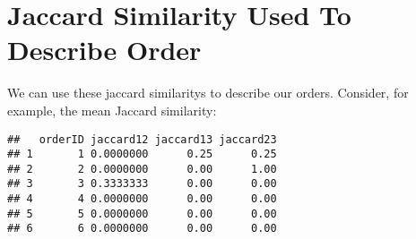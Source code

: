 \documentclass[10pt]{report}
\newenvironment{Shaded}{}{}
\newcommand{\KeywordTok}[1]{\textcolor[rgb]{0.00,0.44,0.13}{\textbf{{#1}}}}
\newcommand{\DecValTok}[1]{\textcolor[rgb]{0.25,0.63,0.44}{{#1}}}
\newcommand{\StringTok}[1]{\textcolor[rgb]{0.25,0.44,0.63}{{#1}}}
\newcommand{\NormalTok}[1]{{#1}}
\begin{document}
\section{Jaccard Similarity Used To Describe
Order}\label{jaccard-similarity-used-to-describe-order}

We can use these jaccard similaritys to describe our orders. Consider,
for example, the mean Jaccard similarity:

\begin{Shaded}
\end{Shaded}

\begin{verbatim}
##   orderID jaccard12 jaccard13 jaccard23
## 1       1 0.0000000      0.25      0.25
## 2       2 0.0000000      0.00      1.00
## 3       3 0.3333333      0.00      0.00
## 4       4 0.0000000      0.00      0.00
## 5       5 0.0000000      0.00      0.00
## 6       6 0.0000000      0.00      0.00
\end{verbatim}
\end{document}
